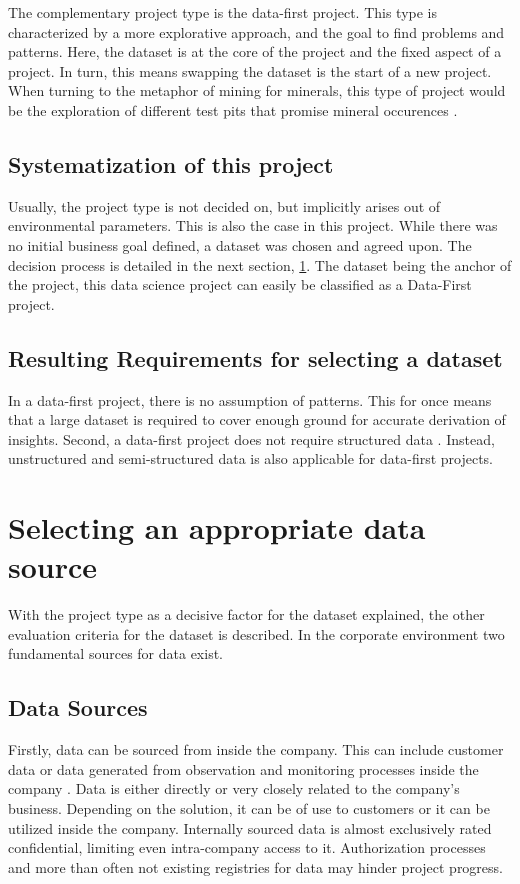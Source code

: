 	The complementary project type is the data-first project. This type is characterized by a more explorative approach, and the goal to find problems and patterns. Here, the dataset is at the core of the project and the fixed aspect of a project. In turn, this means swapping the dataset is the start of a new project. When turning to the metaphor of mining for minerals, this type of project would be the exploration of different test pits that promise mineral occurences \cite{dataScienceProjectTypes}.
	
	\subsection{Systematization of this project}
	Usually, the project type is not decided on, but implicitly arises out of environmental parameters. This is also the case in this project. While there was no initial business goal defined, a dataset was chosen and agreed upon. The decision process is detailed in the next section, \ref{data-source}. The dataset being the anchor of the project, this data science project can easily be classified as a Data-First project.
	
	\subsection{Resulting Requirements for selecting a dataset}
	In a data-first project, there is no assumption of patterns. This for once means that a large dataset is required to cover enough ground for accurate derivation of insights. Second, a data-first project does not require structured data \cite{srivastavaDataMining}. Instead, unstructured and semi-structured data is also applicable for data-first projects.
	
	\section{Selecting an appropriate data source}
	\label{data-source}
	
	With the project type as a decisive factor for the dataset explained, the other evaluation criteria for the dataset is described. In the corporate environment two fundamental sources for data exist. 
	
	\subsection{Data Sources}
	Firstly, data can be sourced from inside the company. This can include customer data or data generated from observation and monitoring processes inside the company \cite{internalExternalData}. Data is either directly or very closely related to the company's business. Depending on the solution, it can be of use to customers or it can be utilized inside the company. Internally sourced data is almost exclusively rated confidential, limiting even intra-company access to it. Authorization processes and more than often not existing registries for data may hinder project progress.
	
